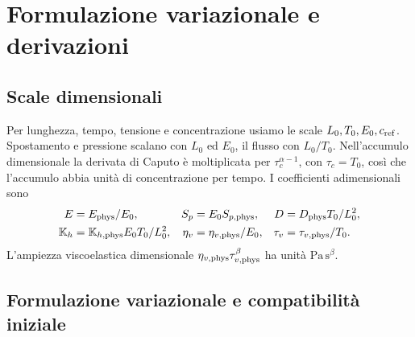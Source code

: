 \section{Formulazione variazionale e derivazioni}
\label{app:model-derivations}
\setcounter{figure}{0}\setcounter{table}{0}\setcounter{equation}{0}

\subsection{Scale dimensionali}
Per lunghezza, tempo, tensione e concentrazione usiamo le scale $L_0,T_0,E_0,c_{\rm ref}$. Spostamento e pressione scalano con $L_0$ ed $E_0$, il flusso con $L_0/T_0$. Nell'accumulo dimensionale la derivata di Caputo è moltiplicata per $\tau_c^{\alpha-1}$, con $\tau_c=T_0$, così che l'accumulo abbia unità di concentrazione per tempo. I coefficienti adimensionali sono
\begin{equation}
\begin{aligned}
 E&=E_{\rm phys}/E_0, & S_p&=E_0S_{p,\rm phys}, &
 D&=D_{\rm phys}T_0/L_0^2,\\
 \mathbb K_h&=\mathbb K_{h,\rm phys}E_0T_0/L_0^2, &
 \eta_v&=\eta_{v,\rm phys}/E_0, &
 \tau_v&=\tau_{v,\rm phys}/T_0 .
\end{aligned}
\label{eq:scales}
\end{equation}
L'ampiezza viscoelastica dimensionale $\eta_{v,\rm phys}\tau_{v,\rm phys}^{\beta}$ ha unità $\mathrm{Pa}\,\mathrm{s}^{\beta}$.

\subsection{Formulazione variazionale e compatibilità iniziale}
\label{sec:forward-weak}

